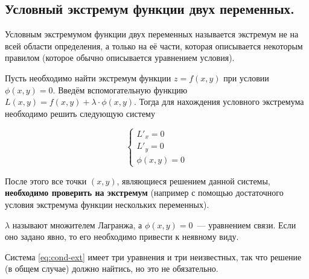 \subsection{%
  Условный экстремум функции двух переменных.%
}

\begin{definition}
  Условным экстремумом функции двух переменных называется экстремум не на всей
  области определения, а только на её части, которая описывается некоторым
  правилом (которое обычно описывается уравнением условия).
\end{definition}


Пусть необходимо найти экстремум функции \(z = f(x, y)\) при условии \(\phi(x,
y) = 0\). Введём вспомогательную функцию \(L(x, y) = f(x, y) + \lambda \cdot
\phi(x, y)\). Тогда для нахождения условного экстремума необходимо решить
следующую систему

\begin{equation*} \label{eq:cond-ext} \tag{JLL}
  \begin{cases}
    L'_x = 0 \\
    L'_y = 0 \\
    \phi(x, y) = 0
  \end{cases}
\end{equation*}

После этого все точки \((x, y)\), являющиеся решением данной системы,
\textbf{необходимо проверить на экстремум} (например с помощью достаточного
условия экстремума функции нескольких переменных).

\begin{remark}
  \(\lambda\) называют множителем Лагранжа, а \(\phi(x, y) = 0\)~--- уравнением
  связи. Если оно задано явно, то его необходимо привести к неявному виду.
\end{remark}

\begin{remark}
  Система \eqref{eq:cond-ext} имеет три уравнения и три неизвестных, так что
  решение (в общем случае) должно найтись, но это не обязательно.
\end{remark}

